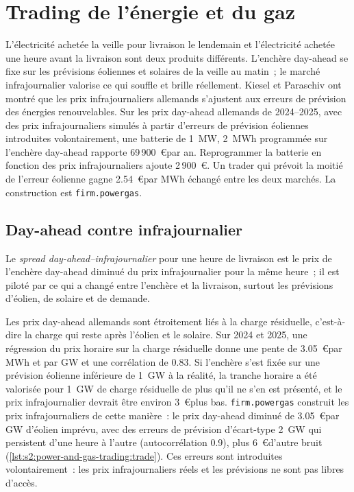 \chapter{Trading de l'énergie et du gaz}\label{ch:s2:power-and-gas-trading}

L'électricité achetée la veille pour livraison le lendemain et l'électricité achetée une heure avant la livraison sont deux produits différents. L'enchère day-ahead se fixe
sur les prévisions éoliennes et solaires de la veille au matin~; le marché infrajournalier valorise ce qui souffle et brille réellement. Kiesel et Paraschiv ont montré que les prix infrajournaliers allemands
s'ajustent aux erreurs de prévision des énergies renouvelables. Sur les prix day-ahead allemands de 2024--2025, avec des prix infrajournaliers simulés à partir d'erreurs de prévision
éoliennes introduites volontairement, une batterie de 1~MW, 2~MWh programmée sur l'enchère day-ahead rapporte 69\,900~\euro par an. Reprogrammer la batterie en fonction des prix infrajournaliers ajoute
2\,900~\euro. Un trader qui prévoit la moitié de l'erreur éolienne gagne 2.54~\euro par MWh échangé entre les deux marchés. La construction est \texttt{firm.powergas}.

\section{Day-ahead contre infrajournalier}

\begin{definition}\label{def:s2:power-and-gas-trading:daid}
Le \emph{spread day-ahead--infrajournalier} pour une heure de livraison est le prix de l'enchère day-ahead diminué du prix infrajournalier pour
la même heure~; il est piloté par ce qui a changé entre l'enchère et la livraison, surtout les prévisions d'éolien, de solaire et de demande.
\end{definition}

Les prix day-ahead allemands sont étroitement liés à la charge résiduelle, c'est-à-dire la charge qui reste après l'éolien et le solaire. Sur 2024 et 2025, une régression du prix horaire sur
la charge résiduelle donne une pente de 3.05~\euro par MWh et par GW et une corrélation de 0.83. Si l'enchère s'est fixée sur une prévision éolienne inférieure de 1~GW à la réalité, la
tranche horaire a été valorisée pour 1~GW de charge résiduelle de plus qu'il ne s'en est présenté, et le prix infrajournalier devrait être environ 3~\euro plus bas. \texttt{firm.powergas} construit les prix infrajournaliers
de cette manière~: le prix day-ahead diminué de 3.05~\euro par GW d'éolien imprévu, avec des erreurs de prévision d'écart-type 2~GW qui persistent d'une heure à
l'autre (autocorrélation 0.9), plus 6~\euro d'autre bruit (\cref{lst:s2:power-and-gas-trading:trade}). Ces erreurs sont introduites volontairement~: les prix infrajournaliers réels et les prévisions
ne sont pas libres d'accès.

